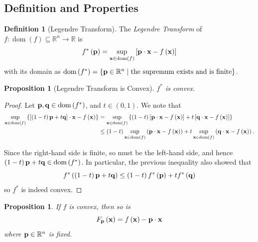 \documentclass[11pt]{article}
\numberwithin{equation}{section}
\newtheorem{proposition}[theorem]{Proposition}
\theoremstyle{definition}
\newtheorem{definition}[theorem]{Definition}
\theoremstyle{remark}
\newcommand{\pqty}[1]{\left(#1\right)}
\newcommand{\bqty}[1]{\left[#1\right]}
\newcommand{\Bqty}[1]{\left\{#1\right\}}
\newcommand{\set}[2]{\left\{#1\mid #2\right\}}
\newcommand{\oointv}[2]{(#1,#2)}
\newcommand{\functiondomain}[3]{#1:#2\to #3}
\newcommand{\RR}{\mathbb{R}}
\newcommand{\vdot}{\cdot}
\newcommand{\legendre}[1]{{#1}^{*}}
\DeclareMathOperator{\dom}{dom}
\begin{document}
\subsection{Definition and Properties}

\begin{definition}[Legendre Transform]\label{variation-unit-0017}
    \label{def:legendre-transform}%
    The \emph{Legendre Transform} of \(\functiondomain{f}{\dom\pqty{f} \subseteq \RR^n}{\RR}\) is
    \[
        \legendre{f} \pqty{\vb{p}} = \sup_{\vb{x} \in \dom \pqty{f}} \bqty{\vb{p} \vdot \vb{x} - f\pqty{\vb{x}}}
    \]
    with its domain as \(\dom \pqty{\legendre{f}} = \set{\vb{p} \in \RR^n}{\text{the supremum exists and is finite}}\).
\end{definition}

\begin{proposition}[Legendre Transform is Convex]\label{variation-unit-0018}
    \label{prop:legendre-convex}%
    \(\legendre{f}\) is convex.
\end{proposition}

\begin{proof}
    Let \(\vb{p}, \vb{q} \in \dom \pqty{\legendre{f}}\), and \(t \in \oointv{0}{1}\). We note that
    \begin{align*}
        \sup_{\vb{x} \in \dom \pqty{f}} \Bqty{\bqty{\pqty{1 - t} \vb{p} + t \vb{q}} \cdot \vb{x} - f\pqty{\vb{x}}} &= \sup_{\vb{x} \in \dom \pqty{f}} \Bqty{\pqty{1 - t} \bqty{\vb{p} \vdot \vb{x} - f\pqty{\vb{x}}} + t \bqty{\vb{q} \vdot \vb{x} - f \pqty{\vb{x}}}} \\
        &\leq \pqty{1 - t} \sup_{\vb{x} \in \dom \pqty{f}} \pqty{\vb{p} \vdot \vb{x} - f\pqty{\vb{x}}} + t \sup_{\vb{x} \in \dom \pqty{f}} \pqty{\vb{q} \vdot \vb{x} - f\pqty{\vb{x}}}.
    \end{align*}

    Since the right-hand side is finite, so must be the left-hand side, and hence \(\pqty{1 - t} \vb{p} + t \vb{q} \in \dom \pqty{\legendre{f}}\). In particular, the previous inequality also showed that
    \[
        \legendre{f} \pqty{\pqty{1 - t} \vb{p} + t \vb{q}} \leq \pqty{1 - t} \legendre{f} \pqty{\vb{p}} + t \legendre{f} \pqty{\vb{q}}
    \]
    so \(\legendre{f}\) is indeed convex.
\end{proof}

\begin{proposition}\label{variation-unit-0019}
    \label{prop:dot-product-convex}%
    If \(f\) is convex, then so is
    \[
        F_{\vb{p}} \pqty{\vb{x}} = f\pqty{\vb{x}} - \vb{p} \vdot \vb{x}
    \]
    where \(\vb{p} \in \RR^n\) is fixed.
\end{proposition}
\end{document}
